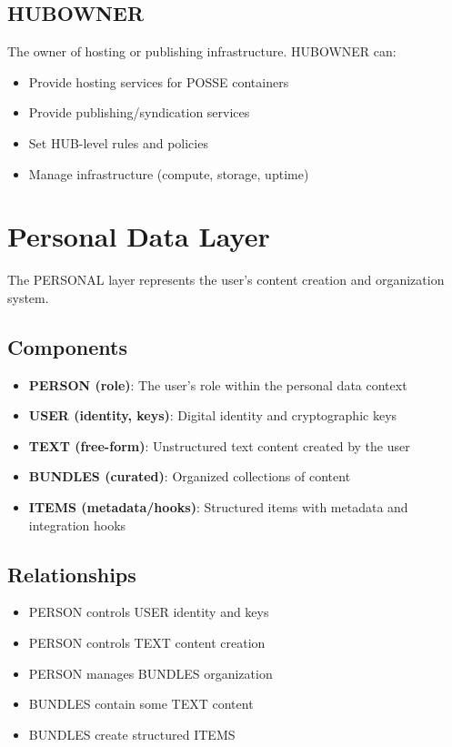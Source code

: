 \documentclass[11pt]{article}
\begin{document}
\subsection{HUBOWNER}
The owner of hosting or publishing infrastructure. HUBOWNER can:
\begin{itemize}
    \item Provide hosting services for POSSE containers
    \item Provide publishing/syndication services
    \item Set HUB-level rules and policies
    \item Manage infrastructure (compute, storage, uptime)
\end{itemize}

\section{Personal Data Layer}

The PERSONAL layer represents the user's content creation and organization system.

\subsection{Components}

\begin{itemize}
    \item \textbf{PERSON (role)}: The user's role within the personal data context
    \item \textbf{USER (identity, keys)}: Digital identity and cryptographic keys
    \item \textbf{TEXT (free-form)}: Unstructured text content created by the user
    \item \textbf{BUNDLES (curated)}: Organized collections of content
    \item \textbf{ITEMS (metadata/hooks)}: Structured items with metadata and integration hooks
\end{itemize}

\subsection{Relationships}

\begin{itemize}
    \item PERSON controls USER identity and keys
    \item PERSON controls TEXT content creation
    \item PERSON manages BUNDLES organization
    \item BUNDLES contain some TEXT content
    \item BUNDLES create structured ITEMS
\end{itemize}
\end{document}
